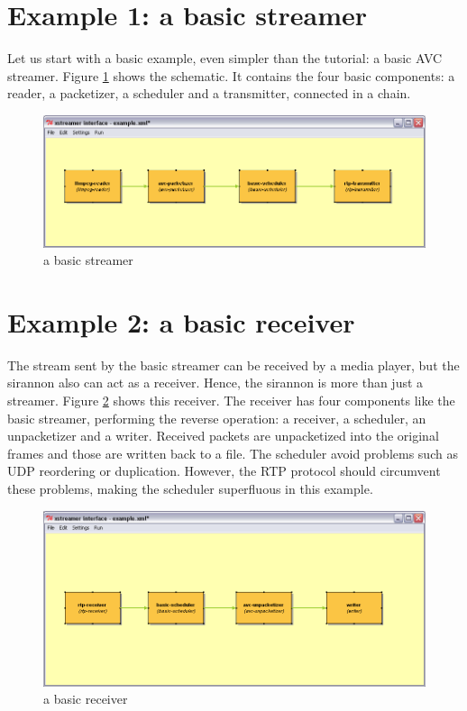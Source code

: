 \documentclass[12pt]{report}
\begin{document}
\section{Example 1: a basic streamer}
Let us start with a basic example, even simpler than the tutorial: a basic AVC streamer. Figure \ref{fig:ex:1} shows the schematic. It contains the four basic components: a reader, a packetizer, a scheduler and a transmitter, connected in a chain.
\begin{center}
\begin{figure}[!ht]
	\includegraphics[width=1.0\textwidth]{./images/ex01.png}
	\caption{a basic streamer}
	\label{fig:ex:1}
\end{figure}
\end{center}
\newpage

\section{Example 2: a basic receiver}
The stream sent by the basic streamer can be received by a media player, but the sirannon also can act as a receiver. Hence, the sirannon is more than just a streamer. Figure \ref{fig:ex:3} shows this receiver. The receiver has four components like the basic streamer, performing the reverse operation: a receiver, a scheduler, an unpacketizer and a writer. Received packets are unpacketized into the original frames and those are written back to a file. The scheduler avoid problems such as UDP reordering or duplication. However, the RTP protocol should circumvent these problems, making the scheduler superfluous in this example.
\begin{center}
\begin{figure}[!ht]
	\includegraphics[width=1.0\textwidth]{./images/ex03.png}
	\caption{a basic receiver}
	\label{fig:ex:3}
\end{figure}
\end{center}
\newpage
\end{document}
